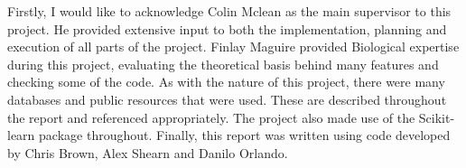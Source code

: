 \begin{acknowledgements}
    Firstly, I would like to acknowledge Colin Mclean as the main supervisor to this project.
    He provided extensive input to both the implementation, planning and execution of all parts of the project.
    Finlay Maguire provided Biological expertise during this project, evaluating the theoretical basis behind many features and checking some of the code.
    As with the nature of this project, there were many databases and public resources that were used.
    These are described throughout the report and referenced appropriately.
    The project also made use of the Scikit-learn\autocite{pedregosa_scikit-learn:_2011} package throughout.
    Finally, this report was written using code developed by Chris Brown, Alex Shearn and Danilo Orlando.

\end{acknowledgements}
